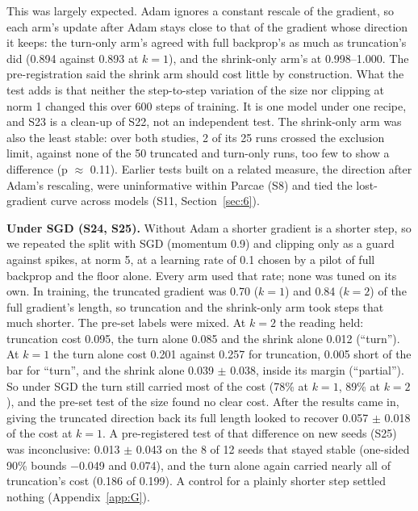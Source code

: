 \documentclass[10pt]{article}
\begin{document}
This was largely expected. Adam ignores a constant rescale of the gradient, so each arm's update after Adam stays close to that of the gradient whose direction it keeps: the turn-only arm's agreed with full backprop's as much as truncation's did (0.894 against 0.893 at $k = 1$), and the shrink-only arm's at 0.998--1.000. The pre-registration said the shrink arm should cost little by construction. What the test adds is that neither the step-to-step variation of the size nor clipping at norm 1 changed this over 600 steps of training. It is one model under one recipe, and S23 is a clean-up of S22, not an independent test. The shrink-only arm was also the least stable: over both studies, 2 of its 25 runs crossed the exclusion limit, against none of the 50 truncated and turn-only runs, too few to show a difference (p $\approx$ 0.11). Earlier tests built on a related measure, the direction after Adam's rescaling, were uninformative within Parcae (S8) and tied the lost-gradient curve across models (S11, Section~\ref{sec:6}).

\textbf{Under SGD (S24, S25).} Without Adam a shorter gradient is a shorter step, so we repeated the split with SGD (momentum 0.9) and clipping only as a guard against spikes, at norm 5, at a learning rate of 0.1 chosen by a pilot of full backprop and the floor alone. Every arm used that rate; none was tuned on its own. In training, the truncated gradient was 0.70 ($k = 1$) and 0.84 ($k = 2$) of the full gradient's length, so truncation and the shrink-only arm took steps that much shorter. The pre-set labels were mixed. At $k = 2$ the reading held: truncation cost 0.095, the turn alone 0.085 and the shrink alone 0.012 (``turn''). At $k = 1$ the turn alone cost 0.201 against 0.257 for truncation, 0.005 short of the bar for ``turn'', and the shrink alone 0.039 $\pm$ 0.038, inside its margin (``partial''). So under SGD the turn still carried most of the cost (78\% at $k = 1$, 89\% at $k = 2$), and the pre-set test of the size found no clear cost. After the results came in, giving the truncated direction back its full length looked to recover 0.057 $\pm$ 0.018 of the cost at $k = 1$. A pre-registered test of that difference on new seeds (S25) was inconclusive: 0.013 $\pm$ 0.043 on the 8 of 12 seeds that stayed stable (one-sided 90\% bounds $-$0.049 and 0.074), and the turn alone again carried nearly all of truncation's cost (0.186 of 0.199). A control for a plainly shorter step settled nothing (Appendix~\ref{app:G}).
\end{document}

